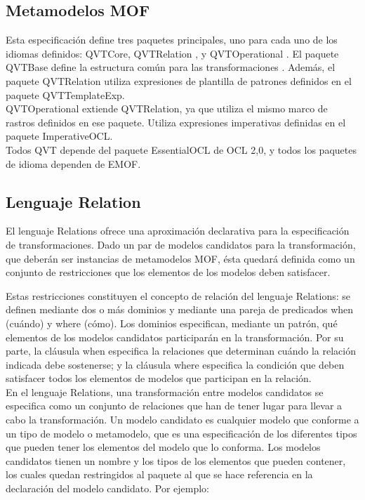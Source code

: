 \subsection{Metamodelos MOF}
\label{Metamodelos MOF}

Esta especificación define tres paquetes principales, uno para cada uno de los idiomas definidos: QVTCore, QVTRelation , y QVTOperational . El paquete QVTBase define la estructura común para las transformaciones . Además, el paquete QVTRelation utiliza expresiones de plantilla de patrones definidos en el paquete QVTTemplateExp.\\
QVTOperational extiende QVTRelation, ya que utiliza el mismo marco de rastros definidos en ese paquete. Utiliza expresiones imperativas definidas en el paquete ImperativeOCL.\\
Todos QVT depende del paquete EssentialOCL de OCL 2,0, y todos los paquetes de idioma dependen de EMOF.

\subsection{Lenguaje Relation}
\label{Lenguaje Relation}


El lenguaje Relations ofrece una aproximación declarativa para la especificación de transformaciones. Dado un par de modelos candidatos para la transformación, que deberán ser instancias de metamodelos MOF, ésta quedará definida como un conjunto de restricciones que los elementos de los modelos deben satisfacer.

Estas restricciones constituyen el concepto de relación del lenguaje Relations: se definen mediante dos o más dominios y mediante una pareja de predicados when (cuándo) y where (cómo). Los dominios especifican, mediante un patrón, qué elementos de los modelos candidatos participarán en la transformación. Por su parte, la cláusula when especifica la relaciones que determinan cuándo la relación indicada debe sostenerse; y la cláusula where especifica la condición que deben satisfacer todos los elementos de modelos que participan en la relación.\\

En el lenguaje Relations, una transformación entre modelos candidatos se especifica como un conjunto de relaciones que han de tener lugar para llevar a cabo la transformación. Un modelo candidato es cualquier modelo que conforme a un tipo de modelo o metamodelo, que es una especificación de los diferentes tipos que pueden tener los elementos del modelo que lo conforma. Los modelos candidatos tienen un nombre y los tipos de los elementos que pueden contener, los cuales quedan restringidos al paquete al que se hace referencia en la declaración del modelo candidato. Por ejemplo:\\

